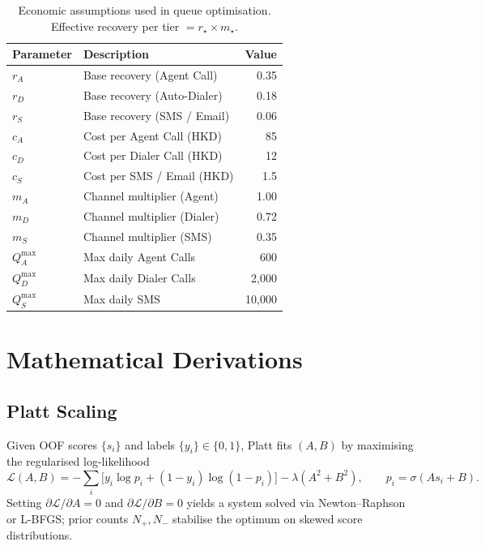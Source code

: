 \documentclass[11pt, a4paper]{article}
\begin{document}
\begin{table}[H]
\centering
\caption{Economic assumptions used in queue optimisation. Effective recovery per tier $=r_\star\times m_\star$.}\label{tab:econ_params}
\small
\begin{tabular}{@{}llr@{}}
\toprule
\textbf{Parameter} & \textbf{Description} & \textbf{Value}\\
\midrule
$r_A$ & Base recovery (Agent Call)           & 0.35\\
$r_D$ & Base recovery (Auto-Dialer)          & 0.18\\
$r_S$ & Base recovery (SMS / Email)          & 0.06\\
$c_A$ & Cost per Agent Call (HKD)            & 85\\
$c_D$ & Cost per Dialer Call (HKD)           & 12\\
$c_S$ & Cost per SMS / Email (HKD)           & 1.5\\
$m_A$ & Channel multiplier (Agent)            & 1.00\\
$m_D$ & Channel multiplier (Dialer)           & 0.72\\
$m_S$ & Channel multiplier (SMS)              & 0.35\\
$Q_A^{\max}$ & Max daily Agent Calls          & 600\\
$Q_D^{\max}$ & Max daily Dialer Calls         & 2{,}000\\
$Q_S^{\max}$ & Max daily SMS                  & 10{,}000\\
\bottomrule
\end{tabular}
\end{table}

\section{Mathematical Derivations}\label{app:mlp_deriv}

\subsection*{Platt Scaling}

Given OOF scores $\{s_i\}$ and labels $\{y_i\}\!\in\!\{0,1\}$, Platt fits $(A,B)$ by maximising the regularised log-likelihood
\[
\mathcal{L}(A,B)=-\sum_i\bigl[y_i\log p_i+(1-y_i)\log(1-p_i)\bigr]-\lambda(A^2+B^2),\qquad p_i=\sigma(A s_i+B).
\]
Setting $\partial\mathcal{L}/\partial A=0$ and $\partial\mathcal{L}/\partial B=0$ yields a system solved via Newton--Raphson or L-BFGS; prior counts $N_+,N_-$ stabilise the optimum on skewed score distributions.
\end{document}
